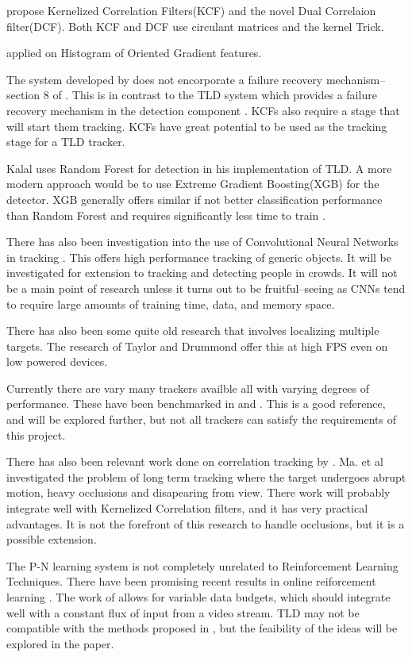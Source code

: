 \citeauthor{Enriques2014} \cite{Enriques2014} propose Kernelized Correlation Filters(KCF) and the novel Dual Correlaion filter(DCF).
Both KCF and DCF use circulant matrices and the kernel Trick.

applied on Histogram of Oriented Gradient features.

The system developed by \citeauthor{Enriques2014} does not encorporate a failure recovery mechanism--section 8 of \cite{Enriques2014}.
This is in contrast to the TLD system which provides a failure recovery mechanism in the detection component \cite{Kalal2011}.
KCFs also require a stage that will start them tracking.
KCFs have great potential to be used as the tracking stage for a TLD tracker.

Kalal uses Random Forest for detection in his implementation of TLD.
A more modern approach would be to use Extreme Gradient Boosting(XGB) for the detector.
XGB generally offers similar if not better classification performance than Random Forest and requires significantly less time to train \cite{comparativeXGB}.

There has also been investigation into the use of Convolutional Neural Networks in tracking \cite{CNNTracking}.
This offers high performance tracking of generic objects.
It will be investigated for extension to tracking and detecting people in crowds.
It will not be a main point of research unless it turns out to be fruitful--seeing as CNNs tend to require large amounts of training time, data, and memory space.

There has also been some quite old research that involves localizing multiple targets.
The research of Taylor and Drummond \cite{taylorDrummondTracking} offer this at high FPS even on low powered devices.

Currently there are vary many trackers availble all with varying degrees of performance.
These have been benchmarked in \cite{VOT2017} and \cite{VOT2020}.
This is a good reference, and will be explored further, but not all trackers can satisfy the requirements of this project. 

There has also been relevant work done on correlation tracking by \cite{Ma2015Correlation}.
Ma. et al investigated the problem of long term tracking where the target undergoes abrupt motion, heavy occlusions and disapearing from view.
There work will probably integrate well with Kernelized Correlation filters, and it has very practical advantages.
It is not the forefront of this research to handle occlusions, but it is a possible extension.

The P-N learning system is not completely unrelated to Reinforcement Learning Techniques.
There have been promising recent results in online reiforcement learning \cite{onlineRL}.
The work of \cite{onlineRL} allows for variable data budgets, which should integrate well with a constant flux of input from a video stream.
TLD may not be compatible with the methods proposed in \cite{onlineRL}, but the feaibility of the ideas will be explored in the paper.
